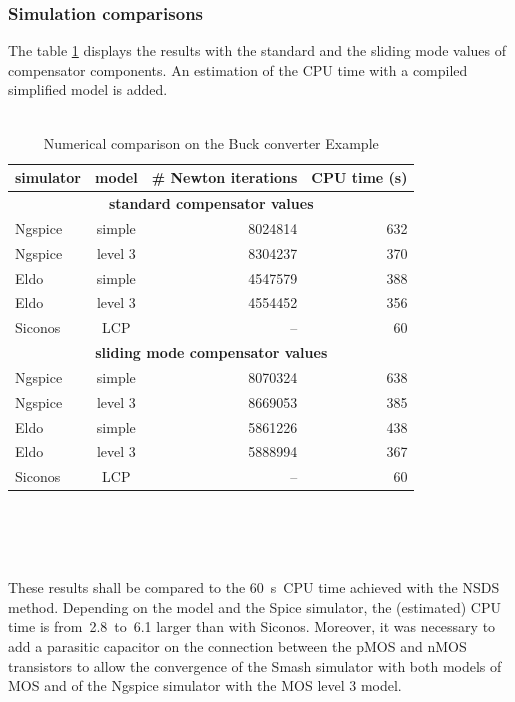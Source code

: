 \subsubsection{Simulation comparisons}
The table \ref{tab:buck} displays the results with the standard and the sliding mode values of compensator components. An estimation of the CPU time with a compiled simplified model is added.
\\
\\
\begin{table}
  \centering
  \begin{tabular}{|l|c|r|r|}
\hline
simulator & model &
{ \# Newton  iterations}
&
{ CPU  time (s)}
\\
\hline
\multicolumn{4}{|c|}{\textbf{standard compensator values}}\\
\hline
{\sc Ngspice} & simple   & 8024814 & 632 \\
{\sc Ngspice} & level 3  & 8304237 & 370 \\
\hline
{\sc Eldo}    & simple   & 4547579 & 388 \\
{\sc Eldo}    & level 3  & 4554452 & 356 \\
\hline
{\sc Siconos}    & LCP   & --  & 60 \\
\hline
\multicolumn{4}{|c|}{\textbf{sliding mode compensator values}}\\
\hline
{\sc Ngspice} & simple   & 8070324 & 638 \\
{\sc Ngspice} & level 3  & 8669053 & 385 \\
\hline
{\sc Eldo}    & simple   & 5861226 & 438 \\
{\sc Eldo}    & level 3  & 5888994 & 367 \\
\hline
{\sc Siconos}    & LCP   & -- & 60 \\
\hline
\end{tabular}\\
\caption{Numerical comparison on the Buck converter Example}
\label{tab:buck}
\end{table}
\\
\\
These results shall be compared to the 60~s~CPU time achieved with the NSDS method.
Depending on the model and the {\sc Spice} simulator, the (estimated) CPU time is from~2.8~to~6.1
larger than with {\sc Siconos}. Moreover, it was necessary to add a parasitic capacitor on the connection between the pMOS and nMOS
transistors to allow the convergence of the {\sc Smash} simulator with both models of MOS
and of the {\sc Ngspice} simulator with the MOS level 3 model.

